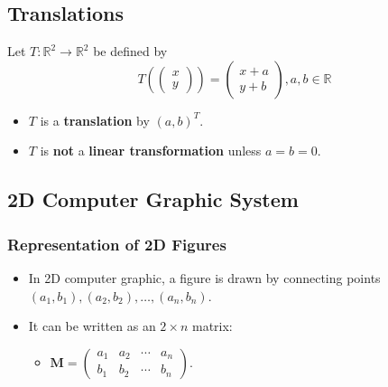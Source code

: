\documentclass[../ma2001_notes.tex]{subfiles}
\begin{document}
\subsection{Translations}
Let \(T:\mathbb{R}^2\to\mathbb{R}^2\) be defined by
\[T\left(\begin{pmatrix}
	x \\ y
\end{pmatrix}\right)=\begin{pmatrix}
	x+a \\ y+b
\end{pmatrix},a,b\in\mathbb{R}\]
\begin{itemize}
	\item\(T\) is a \textbf{translation} by \((a,b)^T\).
	\item\(T\) is \textbf{not} a \textbf{linear transformation} unless \(a=b=0\).
\end{itemize}

\subsection{2D Computer Graphic System}
\subsubsection{Representation of 2D Figures}
\begin{itemize}
	\item In 2D computer graphic, a figure is drawn by connecting points \((a_1,b_1),(a_2,b_2),\ldots,(a_n,b_n)\).
	\item It can be written as an \(2\times n\) matrix:
	\begin{itemize}
		\item\(\bm{M}=\begin{pmatrix}
			a_1 & a_2 & \cdots & a_n \\
			b_1 & b_2 & \cdots & b_n
		\end{pmatrix}\).
	\end{itemize}
\end{itemize}
\end{document}

